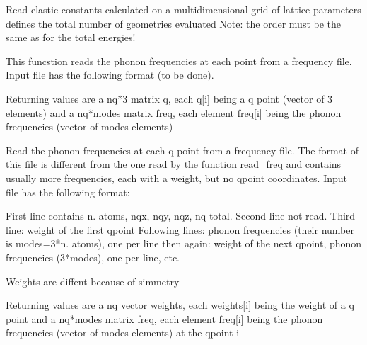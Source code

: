 \documentclass[letterpaper,10pt,english]{sphinxmanual}
\begin{document}

\begin{fulllineitems}
\label{pyqha:pyqha.read.read_elastic_constants_geo}
Read elastic constants calculated on a multidimensional grid of lattice parameters
 defines the total number of geometries evaluated
Note: the order must be the same as for the total energies!

\end{fulllineitems}


\begin{fulllineitems}
\label{pyqha:pyqha.read.read_freq}
This funcstion reads the phonon frequencies at each  point from a frequency file.  
Input file has the following format (to be done).

Returning values are a nq*3 matrix q, each q{[}i{]} being a q point (vector of 3 elements)
and a nq*modes matrix freq, each element freq{[}i{]} being the phonon frequencies
(vector of modes elements)

\end{fulllineitems}


\begin{fulllineitems}
\label{pyqha:pyqha.read.read_freq_ext}
Read the phonon frequencies at each q point from a frequency file. The format 
of this file is different from the one read by the function read\_freq and
contains usually more frequencies, each with a weight, but no qpoint coordinates.
Input file has the following format:

First line contains n. atoms, nqx, nqy, nqz, nq total.
Second line not read.
Third line: weight of the first qpoint
Following lines: phonon frequencies (their number is modes=3*n. atoms), one per line
then again: weight of the next qpoint, phonon frequencies (3*modes), one per line, etc.

Weights are diffent because of simmetry

Returning values are a nq vector weights, each weights{[}i{]} being the weight of a q point 
and a nq*modes matrix freq, each element freq{[}i{]} being the phonon frequencies
(vector of modes elements) at the qpoint i

\end{fulllineitems}
\end{document}
